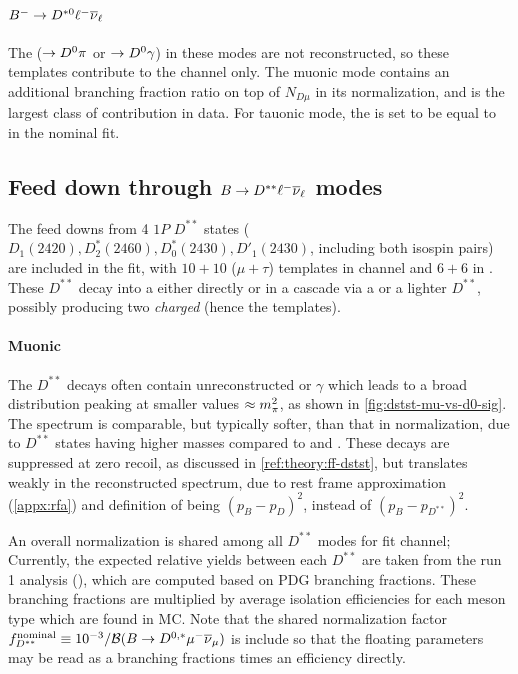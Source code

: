 \paragraph{${{{B}^-}} \rightarrow D^{*0}{\ell^-}{{\overline{\nu}}_\ell}$}
The \Dstarz ($\rightarrow {\ensuremath{{D}^0}} \pi$ or $\rightarrow {\ensuremath{{D}^0}} \gamma$)
in these modes are not reconstructed,
so these templates contribute to the \Dz channel only.
The muonic mode contains an additional branching fraction ratio on top of
$N_{D\mu}$ in its normalization, and is the largest class of contribution
in \Dz data.
For tauonic mode, the \RDstz is set to be equal to \RDstp in the nominal fit.


\subsection{Feed down through $B \rightarrow D^{**}{\ell^-}{{\overline{\nu}}_\ell}$ modes}
\label{tmpl:dstst}

The feed downs from 4 $1P$ $D^{**}$ states
($D_1(2420), D_2^*(2460), D_0^*(2430), D'_1(2430)$, including both isospin
pairs) are included in the fit,
with $10+10$ ($\mu+\tau$) templates in \Dz channel
and $6+6$ in \Dstar.
These $D^{**}$ decay into a \Dz either directly or in a
cascade via a \Dstar or a lighter $D^{**}$,
possibly producing two \emph{charged} \pion
(hence the \Dz\pion\pion templates).

\paragraph{Muonic}
The $D^{**}$ decays often contain unreconstructed \piz or $\gamma$ which leads
to a broad \mmSq distribution peaking at smaller values $\approx m^2_{\pi}$,
as shown in \cref{fig:dstst-mu-vs-d0-sig}.
The \el spectrum is comparable, but typically softer, than that in normalization,
due to $D^{**}$ states having higher masses compared to \Dz and \Dstar.
These decays are suppressed at zero recoil, as discussed in
\cref{ref:theory:ff-dstst},
but translates weakly in the reconstructed \qSq spectrum, due to rest frame
approximation (\cref{appx:rfa}) and definition of \qSq being
$(p_B - p_D)^2$, instead of $(p_B - p_{D^{**}})^2$.

An overall normalization is shared among all $D^{**}$ modes for \Dstar fit
channel;
Currently, the expected relative yields between each $D^{**}$ are
taken from the run 1 analysis (\cite{LHCb-ANA-2020-056}),
which are computed based on PDG branching fractions.
These branching fractions are multiplied by average isolation efficiencies
for each \B meson type which are found in MC.
Note that the shared normalization factor
$f^\text{nominal}_{D^{**}} \equiv 10^{-3} / \mathcal{B}(B \rightarrow D^{0,*}{\mu^-}{{\overline{\nu}}_\mu})$
is include so that the floating parameters may be read as a branching fractions
times an efficiency directly.

